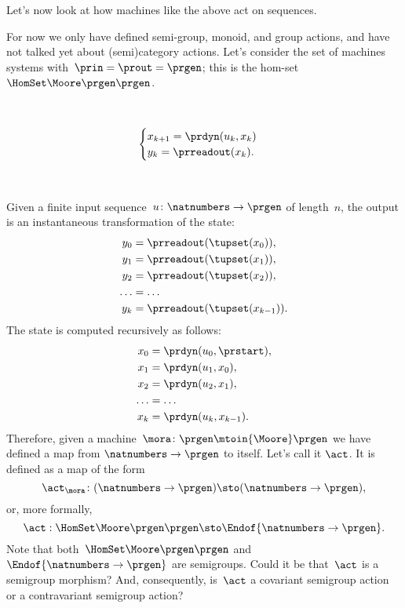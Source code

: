 Let's now look at how machines like the above act on sequences.

For now we only have defined semi-group, monoid, and group actions, and have not talked yet about (semi)category actions.
Let's consider the set of machines systems with~$\prin = \prout = \prgen$; this is the hom-set~$\HomSet\Moore\prgen\prgen$.

\

\begin{equation}
    \begin{cases}
        x_{k+1} = \prdyn(u_k, x_k) \\
        y_{k}   = \prreadout(x_{k}).
    \end{cases}
\end{equation}

\

Given a finite input sequence~$u\colon \natnumbers \to \prgen$ of length~$n$, the output is an instantaneous transformation of the state:
%
\begin{equation}
    \label{eq:actions-on-sequences-y}
    \begin{aligned}
        y_0   & = \prreadout(\tupset(x_0)), \\
        y_1   & = \prreadout(\tupset(x_1)), \\
        y_2   & = \prreadout(\tupset(x_2)), \\
        \dots & = \dots \\
        y_{k} & = \prreadout(\tupset(x_{k-1})).
    \end{aligned}
\end{equation}
%
The state is computed recursively as follows:
\begin{equation}
    \label{eq:actions-on-sequences-x}
    \begin{aligned}
        x_0   & = \prdyn(u_0, \prstart), \\
        x_1   & = \prdyn(u_1, x_0), \\
        x_2   & = \prdyn(u_2, x_1), \\
        \dots & = \dots \\
        x_{k} & = \prdyn(u_{k}, x_{k-1}).
    \end{aligned}
\end{equation}
%
Therefore, given a machine~$\mora \colon \prgen \mtoin{\Moore} \prgen$ we have defined a map from $\natnumbers \to \prgen$ to itself.
Let's call it $\act$.
It is defined as a map of the form
%
\begin{equation}
    \label{eq:actions-on-sequences-1}
    \act_{\mora}\colon  (\natnumbers \to \prgen)  \sto  (\natnumbers \to \prgen),
\end{equation}
%
or, more formally,
%
\begin{equation}
    \label{eq:actions-on-sequences-2}
    \act: \HomSet\Moore\prgen\prgen \sto \Endof {\natnumbers \to \prgen}.
\end{equation}
%
Note that both~$\HomSet\Moore\prgen\prgen$ and $\Endof {\natnumbers \to \prgen}$ are semigroups.
Could it be that~$\act$ is a semigroup morphism?
And, consequently, is~$\act$ a covariant semigroup action or a contravariant semigroup action?


